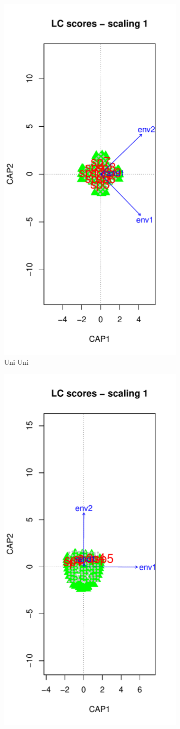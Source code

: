 		\begin{figure}[h!]
			
			\begin{subfigure}{0.5\textwidth}		
					\centering
					\includegraphics[width=.55\linewidth]{"../02_Figures/dbRDASM1"}
					\caption{Uni-Uni}
			\end{subfigure}
			\begin{subfigure}{0.5\textwidth}
					\centering		
					\includegraphics[width=.55\linewidth]{"../02_Figures/dbRDASM2"}

\end{subfigure}
\end{figure}
